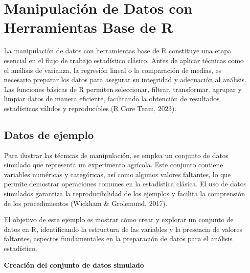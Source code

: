 \documentclass[
  spanish,
  a4paper,
  DIV=11,
  numbers=noendperiod,
  onepage,
  openany]{scrreprt}
\begin{document}

\chapter{Manipulación de Datos con Herramientas Base de
R}\label{manipulaciuxf3n-de-datos-con-herramientas-base-de-r}

La manipulación de datos con herramientas base de R constituye una etapa
esencial en el flujo de trabajo estadístico clásico. Antes de aplicar
técnicas como el análisis de varianza, la regresión lineal o la
comparación de medias, es necesario preparar los datos para asegurar su
integridad y adecuación al análisis. Las funciones básicas de R permiten
seleccionar, filtrar, transformar, agrupar y limpiar datos de manera
eficiente, facilitando la obtención de resultados estadísticos válidos y
reproducibles (R Core Team, 2023).

\section{Datos de ejemplo}\label{datos-de-ejemplo}

Para ilustrar las técnicas de manipulación, se emplea un conjunto de
datos simulado que representa un experimento agrícola. Este conjunto
contiene variables numéricas y categóricas, así como algunos valores
faltantes, lo que permite demostrar operaciones comunes en la
estadística clásica. El uso de datos simulados garantiza la
reproducibilidad de los ejemplos y facilita la comprensión de los
procedimientos (Wickham \& Grolemund, 2017).

El objetivo de este ejemplo es mostrar cómo crear y explorar un conjunto
de datos en R, identificando la estructura de las variables y la
presencia de valores faltantes, aspectos fundamentales en la preparación
de datos para el análisis estadístico.

\textbf{Creación del conjunto de datos simulado}
\end{document}
